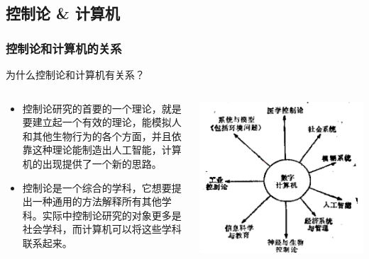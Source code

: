\documentclass[12pt,AutoFakeBold,aspectratio=43,mathserif]{beamer}
\begin{document}
\begin{frame}
\begin{columns}
\begin{column}{.4\linewidth}
    \subsection{控制论 \& 计算机}
    \begin{frame}
        \frametitle{控制论和计算机的关系}
        \begin{block}{\textnormal{为什么控制论和计算机有关系？}} \end{block} \pause
        \begin{columns}
            \begin{column}{.5\linewidth}
                \begin{itemize}
                    \item  \footnotesize 控制论研究的首要的一个理论，就是要建立起一个有效的理论，能模拟人和其他生物行为的各个方面，并且依靠这种理论能制造出人工智能，计算机的出现提供了一个新的思路。 \pause
                    \item  \footnotesize 控制论是一个综合的学科，它想要提出一种通用的方法解释所有其他学科。实际中控制论研究的对象更多是社会学科，而计算机可以将这些学科联系起来。 
                \end{itemize}
            \end{column}
            \begin{column}{.5\linewidth}
                \includegraphics[width=.4\paperwidth]{figures/3-3.jpg}
            \end{column}
        \end{columns}
        

\end{frame}
\end{column}
\end{columns}
\end{frame}
\end{document}
